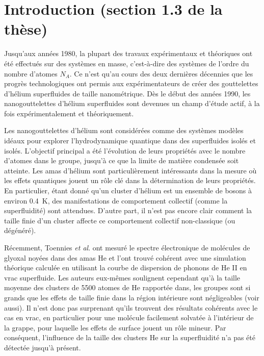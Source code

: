 	\section*{Introduction (section 1.3 de la thèse)}
		Jusqu'aux années 1980, la plupart des travaux expérimentaux et théoriques ont été effectués sur des systèmes en masse, c'est-à-dire des systèmes de l'ordre du nombre d'atomes $N_A$. Ce n'est qu'au cours des deux dernières décennies que les progrès technologiques ont permis aux expérimentateurs de créer des gouttelettes d'hélium superfluides de taille nanométrique. Dès le début des années 1990, les nanogouttelettes d'hélium superfluides sont devenues un champ d'étude actif, à la fois expérimentalement et théoriquement. 
		
		Les nanogouttelettes d'hélium sont considérées comme des systèmes modèles idéaux pour explorer l'hydrodynamique quantique dans des superfluides isolés et isolés. L'objectif principal a été l'évolution de leurs propriétés avec le nombre d'atomes dans le groupe, jusqu'à ce que la limite de matière condensée soit atteinte. Les amas d'hélium sont particulièrement intéressants dans la mesure où les effets quantiques jouent un rôle clé dans la détermination de leurs propriétés. En particulier, étant donné qu'un cluster d'hélium est un ensemble de bosons à environ 0.4~K\citep{Brink1990, Hartmann1995}, des manifestations de comportement collectif (comme la superfluidité) sont attendues. D'autre part, il n'est pas encore clair comment la taille finie d'un cluster affecte ce comportement collectif non-classique (ou dégénéré).

		Récemment, Toennies \emph{et al}.\citep {Hartmann1996} ont mesuré le spectre électronique de molécules de glyoxal noyées dans des amas He et l'ont trouvé cohérent avec une simulation théorique calculée en utilisant la courbe de dispersion de phonons de He II en vrac superfluide. Les auteurs eux-mêmes soulignent cependant qu'à la taille moyenne des clusters de 5500 atomes de He rapportée dans, les groupes sont si grands que les effets de taille finie dans la région intérieure sont négligeables (voir aussi). Il n'est donc pas surprenant qu'ils trouvent des résultats cohérents avec le cas en vrac, en particulier pour une molécule facilement solvatée à l'intérieur de la grappe, pour laquelle les effets de surface jouent un rôle mineur. Par conséquent, l'influence de la taille des clusters He sur la superfluidité n'a pas été détectée jusqu'à présent.

